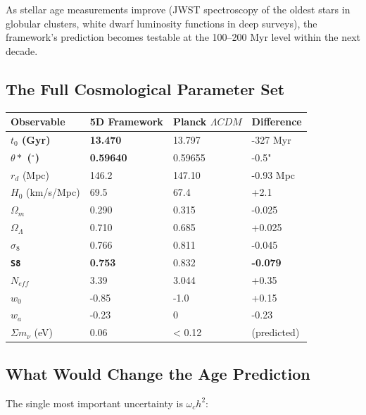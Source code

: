 \documentclass[aps,prd,preprint,superscriptaddress,longbibliography]{revtex4-2}
\begin{document}
As stellar age measurements improve (JWST spectroscopy of the oldest stars in globular clusters, white dwarf luminosity functions in deep surveys), the framework's prediction becomes testable at the 100--200 Myr level within the next decade.



\subsection{The Full Cosmological Parameter Set}


\begin{table}[H]
\begin{ruledtabular}
\begin{tabular}{p{3.8cm}p{3.8cm}p{3.8cm}p{3.8cm}}
Observable & 5D Framework & Planck $\Lambda CDM$ & Difference \\
\hline
\textbf{$t_{0}$ (Gyr)} & \textbf{13.470} & 13.797 & -327 Myr \\
\textbf{$\theta*$ ($^{\circ}$)} & \textbf{0.59640} & 0.59655 & -0.5" \\
$r_d$ (Mpc) & 146.2 & 147.10 & -0.93 Mpc \\
$H_{0}$ (km/s/Mpc) & 69.5 & 67.4 & +2.1 \\
$\Omega_m$ & 0.290 & 0.315 & -0.025 \\
$\Omega_\Lambda$ & 0.710 & 0.685 & +0.025 \\
$\sigma_{8}$ & 0.766 & 0.811 & -0.045 \\
\textbf{\texttt{S8}} & \textbf{0.753} & 0.832 & \textbf{-0.079} \\
$N_{eff}$ & 3.39 & 3.044 & +0.35 \\
$w_{0}$ & -0.85 & -1.0 & +0.15 \\
$w_a$ & -0.23 & 0 & -0.23 \\
$\Sigma m_\nu$ (eV) & 0.06 & < 0.12 & (predicted) \\
\end{tabular}
\end{ruledtabular}
\end{table}



\subsection{What Would Change the Age Prediction}

The single most important uncertainty is $\omega_c h^{2}$:
\end{document}
